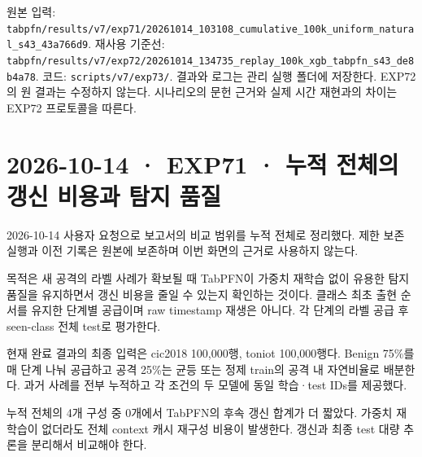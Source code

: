 원본 입력: \texttt{tabpfn/\allowbreak{}\allowbreak{}r\allowbreak{}esults/\allowbreak{}\allowbreak{}v\allowbreak{}7/\allowbreak{}\allowbreak{}exp71/\allowbreak{}\allowbreak{}20261014\allowbreak{}\_\allowbreak{}\allowbreak{}103108\_\allowbreak{}\allowbreak{}cumulati\allowbreak{}ve\_\allowbreak{}\allowbreak{}100k\_\allowbreak{}\allowbreak{}uniform\_\allowbreak{}\allowbreak{}natural\_\allowbreak{}\allowbreak{}s43\_\allowbreak{}\allowbreak{}43a7\allowbreak{}66d9}. 재사용 기준선: \texttt{tabpfn/\allowbreak{}\allowbreak{}r\allowbreak{}esults/\allowbreak{}\allowbreak{}v\allowbreak{}7/\allowbreak{}\allowbreak{}exp72/\allowbreak{}\allowbreak{}20261014\allowbreak{}\_\allowbreak{}\allowbreak{}134735\_\allowbreak{}\allowbreak{}replay\_\allowbreak{}\allowbreak{}1\allowbreak{}00k\_\allowbreak{}\allowbreak{}xgb\_\allowbreak{}\allowbreak{}tabpfn\_\allowbreak{}\allowbreak{}s\allowbreak{}43\_\allowbreak{}\allowbreak{}de8b4\allowbreak{}a78}. 코드: \texttt{scripts/\allowbreak{}\allowbreak{}v7/\allowbreak{}\allowbreak{}exp73\allowbreak{}/\allowbreak{}\allowbreak{}}. 결과와 로그는 관리 실행 폴더에 저장한다. EXP72의 원 결과는 수정하지 않는다. 시나리오의 문헌 근거와 실제 시간 재현과의 차이는 EXP72 프로토콜을 따른다.



\section{2026-10-14 · EXP71 · 누적 전체의 갱신 비용과 탐지 품질}
\label{report:20261014_exp71_cumulative_results}
2026-10-14 사용자 요청으로 보고서의 비교 범위를 누적 전체로 정리했다. 제한 보존 실행과 이전 기록은 원본에 보존하며 이번 화면의 근거로 사용하지 않는다.

목적은 새 공격의 라벨 사례가 확보될 때 TabPFN이 가중치 재학습 없이 유용한 탐지 품질을 유지하면서 갱신 비용을 줄일 수 있는지 확인하는 것이다. 클래스 최초 출현 순서를 유지한 단계별 공급이며 raw timestamp 재생은 아니다. 각 단계의 라벨 공급 후 seen-class 전체 test로 평가한다.

현재 완료 결과의 최종 입력은 cic2018 100,000행, toniot 100,000행다. Benign 75\%를 매 단계 나눠 공급하고 공격 25\%는 균등 또는 정제 train의 공격 내 자연비율로 배분한다. 과거 사례를 전부 누적하고 각 조건의 두 모델에 동일 학습·test IDs를 제공했다.

누적 전체의 4개 구성 중 0개에서 TabPFN의 후속 갱신 합계가 더 짧았다. 가중치 재학습이 없더라도 전체 context 캐시 재구성 비용이 발생한다. 갱신과 최종 test 대량 추론을 분리해서 비교해야 한다.


